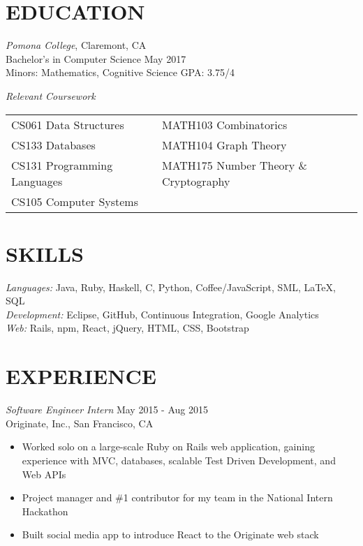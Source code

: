\documentclass[margin, 10pt]{res} %
\begin{document}
\begin{resume}

\vspace{-1em}
\section{EDUCATION}

{\sl Pomona College}, Claremont, CA \\
Bachelor's in Computer Science \hfill May 2017 \\
Minors: Mathematics, Cognitive Science \hfill GPA: 3.75/4

{\it Relevant Coursework} \\
\begin{tabular}{l l}
CS061 Data Structures & MATH103 Combinatorics \\
CS133 Databases & MATH104 Graph Theory \\
CS131 Programming Languages & MATH175 Number Theory \& Cryptography \\
CS105 Computer Systems 
\end{tabular} 
 
\section{SKILLS} 

{\sl Languages:} Java, Ruby, Haskell, C, Python, Coffee/JavaScript, SML,  \LaTeX , SQL \\
{\sl Development:} Eclipse, GitHub, Continuous Integration, Google Analytics \\
{\sl Web:} Rails, npm, React, jQuery, HTML, CSS, Bootstrap

\section{EXPERIENCE}

{\sl Software Engineer Intern} \hfill May 2015 - Aug 2015 \\
Originate, Inc., San Francisco, CA
\begin{itemize} \itemsep -2pt %
\item Worked solo on a large-scale Ruby on Rails web application, gaining experience with MVC, databases, scalable Test Driven Development, and Web APIs
\item Project manager and \#1 contributor  for my team in the National Intern Hackathon
\item Built social media app to introduce React to the Originate web stack
\end{itemize}



\end{resume}
\end{document}
